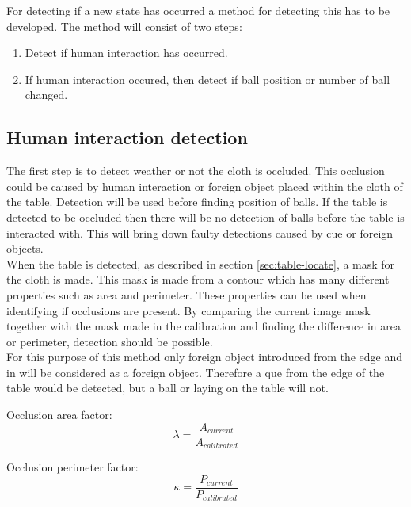 For detecting if a new state has occurred a method for detecting this has to be developed. The method will consist of two steps:

\begin{enumerate}
	\item Detect if human interaction has occurred.
	\item If human interaction occured, then detect if ball position or number of ball changed.
\end{enumerate}


\subsection{Human interaction detection}
The first step is to detect weather or not the cloth is occluded. This occlusion could be caused by human interaction or foreign object placed within the cloth of the table. Detection will be used before finding position of balls. If the table is detected to be occluded then there will be no detection of balls before the table is interacted with. This will bring down faulty detections caused by cue or foreign objects.\\

When the table is detected, as described in section \ref{sec:table-locate}, a mask for the cloth is made. This mask is made from a contour which has many different properties such as area and perimeter. These properties can be used when identifying if occlusions are present. By comparing the current image mask together with the mask made in the calibration and finding the difference in area or perimeter, detection should be possible.\\

For this purpose of this method only foreign object introduced from the edge and in will be considered as a foreign object. Therefore a que from the edge of the table would be detected, but a ball or laying on the table will not.

Occlusion area factor:
\begin{equation}
\lambda = \frac{A_{current}}{A_{calibrated}}
\label{eq:area}
\end{equation}

Occlusion perimeter factor:
\begin{equation}
\kappa = \frac{P_{current}}{P_{calibrated}}
\label{eq:perimeter}
\end{equation}

